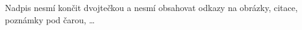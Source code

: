 \documentclass[a4paper, twocolumn, 10pt]{article}
\begin{document}
\item Nadpis nesmí končit dvojtečkou a nesmí obsahovat odkazy na obrázky, citace, poznámky pod čarou, \dots
\end{document}
